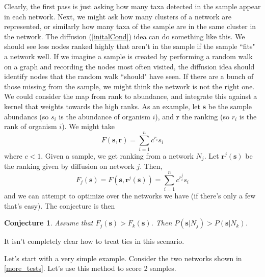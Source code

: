 \documentclass[10pt]{article}
\newtheorem{conj}{Conjecture}
\theoremstyle{definition}
\numberwithin{theorem}{section}
\numberwithin{definition}{section}
\numberwithin{lemma}{section}
\numberwithin{corollary}{section}
\numberwithin{clm}{section}
\numberwithin{rmk}{section}
\renewcommand{\b}{\bm}
\begin{document}
Clearly, the first pass is just asking how many taxa detected in the sample appear in each network. Next, we might ask how many clusters of a network are represented, or similarly how many taxa of the sample are in the same cluster in the network. The diffusion (\cref{initalCond}) idea can do something like this. We should see less nodes ranked highly that aren't in the sample if the sample ``fits" a network well. If we imagine a sample is created by performing a random walk on a graph and recording the nodes most often visited, the diffusion idea should identify nodes that the random walk ``should" have seen. If there are a bunch of those missing from the sample, we might think the network is not the right one. We could consider the map from rank to abundance, and integrate this against a kernel that weights towards the high ranks. As an example, let $\b{s}$ be the sample abundancs (so $s_i$ is the abundance of organism $i$), and $\b{r}$ the ranking (so $r_i$ is the rank of organism $i$). We might take 
\[
F(\b{s},\b{r}) = \sum_{i=1}^n c^{r_i} s_i
\]
where $c<1$. Given a sample, we get ranking from a network $N_j$. Let $\b{r}^j(\b{s})$ be the ranking given by diffusion on network $j$. Then,
\[
F_j(\b{s}) = F(\b{s},\b{r}^j(\b{s})) = \sum_{i=1}^n c^{r_i^j} s_i
\]
and we can attempt to optimize over the networks we have (if there's only a few that's easy). The conjecture is then
\begin{conj}
	Assume that $F_j(\b{s}) > F_k(\b{s})$. Then $P(\b{s}|N_j) > P(\b{s}|N_k)$.
\end{conj}

It isn't completely clear how to treat ties in this scenario.

Let's start with a very simple example. Consider the two networks shown in \cref{more_tests}. Let's use this method to score 2 samples. 
\end{document}

